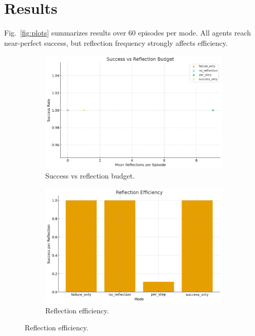\documentclass[conference]{IEEEtran}
\begin{document}
\section{Results}
Fig.~\ref{fig:plots} summarizes results over 60 episodes per mode.
All agents reach near-perfect success,
but reflection frequency strongly affects efficiency.

\begin{figure}[!t]
\centering
\begin{subfigure}{0.48\linewidth}
\includegraphics[width=\linewidth]{plots/reflection_timing_success.png}
\caption{Success vs reflection budget.}
\end{subfigure}
\hfill
\begin{subfigure}{0.48\linewidth}
\includegraphics[width=\linewidth]{plots/reflection_timing_efficiency.png}
\caption{Reflection efficiency.}
\end{subfigure}
\vspace{2mm}

\end{figure}
\end{document}
